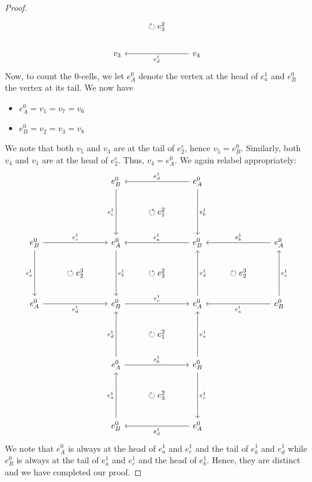 \documentclass[english]{article}
\theoremstyle{remark}
\theoremstyle{definition}
\begin{document}
\begin{proof}
\begin{equation}
\begin{tikzcd}[column sep=normal]
	&&&	\circlearrowright e_3^2	&&&\\
	&&v_{3}\arrow[rr,"e_d^1",swap,leftarrow]		&&v_{4}		&&	
	\end{tikzcd}\label{3id}
	\end{equation}
	Now, to count the 0-cells, we let $e^0_A$ denote the vertex at the head of $e_a^1$ and $e_B^0$ the vertex at its tail. We now have \begin{itemize}
		\item $e^0_A=v_1=v_7=v_6$
		\item $e^0_B=v_2=v_3=v_8$
	\end{itemize}
	We note that both $v_5$ and $v_3$ are at the tail of $e_2^c$, hence $v_5=e^0_B$. Similarly, both $v_4$ and $v_1$ are at the head of $e_2^c$. Thus, $v_4=e^0_A$. We again relabel appropriately:\\
	\begin{equation}
	\begin{tikzcd}[column sep=normal]
	&&e^0_B\arrow[dd,"e_c^1",swap]\arrow[rr,"e_d^1",leftarrow]		&&e^0_A\arrow[dd,"e_b^1"]		&&\\
	&&&		\circlearrowleft e_1^2&&&\\
	e^0_B\arrow[dd,"e_a^1",swap]\arrow[rr,"e_c^1"]
	&&e^0_A\arrow[dd,"e_b^1"]\arrow[rr,"e_a^1",leftarrow]&&e^0_B	\arrow[dd,"e_d^1",leftarrow]\arrow[rr,"e_b^1",leftarrow]	&&e^0_A\arrow[dd,"e_c^1",leftarrow]\\
	&	\circlearrowleft e_2^3	&&	\circlearrowleft e_3^2	&&\circlearrowright e_2^3	&\\
	e^0_A\arrow[rr,"e_d^1",swap]	&&e^0_B	\arrow[dd,"e_d^1",swap,leftarrow]\arrow[rr,"e_c^1"]	&&e^0_A\arrow[dd,"e_a^1",leftarrow]\arrow[rr,"e_a^1",swap,leftarrow]		&&e^0_B\\
	&&&	\circlearrowright e_1^2	&&&\\
	&&e^0_A\arrow[dd,"e_a^1",swap,leftarrow]\arrow[rr,"e_b^1"]		&&e^0_B\arrow[dd,"e_c^1"]	&&\\
	&&&	\circlearrowright e_3^2	&&&\\
	&&e^0_B\arrow[rr,"e_d^1",swap,leftarrow]		&&e^0_A		&&	
	\end{tikzcd}\label{4id}
	\end{equation}
	We note that $e^0_A$ is always at the head of $e_a^1$ and $e_c^1$ and the tail of $e_b^1$ and $e_d^1$ while $e^0_B$ is always at the tail of $e_a^1$ and $e_c^1$ and the head of $e_b^1$. Hence, they are distinct and we have completed our proof.
\end{proof}
\end{document}

